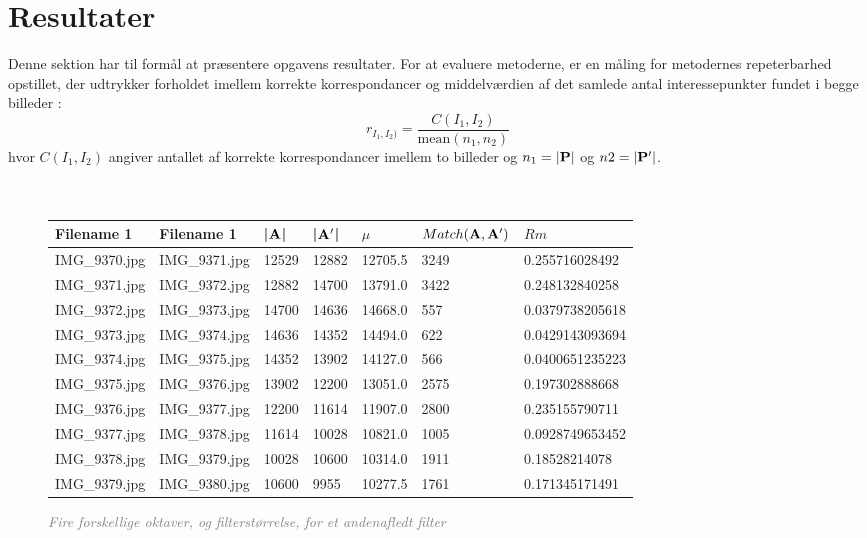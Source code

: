 \chapter{Resultater}
Denne sektion har til formål at præsentere opgavens resultater. For at evaluere metoderne, er en måling for metodernes repeterbarhed opstillet, der udtrykker forholdet imellem korrekte korrespondancer og middelværdien af det samlede antal interessepunkter fundet i begge billeder \cite{eval}:
\begin{equation}
r_{I_1,I_2)}=\dfrac{C(I_1,I_2)}{\text{mean}(n_1,n_2)}
\end{equation}
hvor $C(I_1,I_2)$ angiver antallet af korrekte korrespondancer imellem to billeder og $n_1=\bold{|P|}$ og $n2=\bold{|P'|}$.
\\ \\ \\ 
\begin{figure}[H]
    \centering
    \begin{center}    
    \begin{tabular}{ | l | l | l | l | l | l | l |}
    \hline
    Filename 1 & Filename 1 & |$\bold{A}$| & |$\bold{A'}$| & $\mu$ & $Match(\bold{A}, \bold{A}')$ & $Rm$ \\ \hline
IMG\_9370.jpg &	IMG\_9371.jpg &	12529 &	12882 &	12705.5 &	3249 &	0.255716028492\\ \hline
IMG\_9371.jpg &	IMG\_9372.jpg &	12882 &	14700 &	13791.0 &	3422 &	0.248132840258\\ \hline
IMG\_9372.jpg &	IMG\_9373.jpg &	14700 &	14636 &	14668.0 &	557 &	0.0379738205618\\ \hline
IMG\_9373.jpg &	IMG\_9374.jpg &	14636 &	14352 &	14494.0 &	622 &	0.0429143093694\\ \hline
IMG\_9374.jpg &	IMG\_9375.jpg &	14352 &	13902 &	14127.0 &	566 &	0.0400651235223\\ \hline
IMG\_9375.jpg &	IMG\_9376.jpg &	13902 &	12200 &	13051.0 &	2575 &	0.197302888668\\ \hline
IMG\_9376.jpg &	IMG\_9377.jpg &	12200 &	11614 &	11907.0 &	2800 &	0.235155790711\\ \hline
IMG\_9377.jpg &	IMG\_9378.jpg &	11614 &	10028 &	10821.0 &	1005 &	0.0928749653452\\ \hline
IMG\_9378.jpg &	IMG\_9379.jpg &	10028 &	10600 &	10314.0 &	1911 &	0.18528214078\\ \hline
IMG\_9379.jpg &	IMG\_9380.jpg &	10600 &	9955 &	10277.5 &	1761 &	0.171345171491\\ \hline
    \end{tabular}       
    \caption{\textcolor{gray}{\footnotesize \textit{Fire forskellige oktaver, og filterstørrelse, for et andenafledt filter}}}
    \label{fig:secderivfiltersize}
     \end{center}
     \vspace{-2.5em}
\end{figure} \noindent
